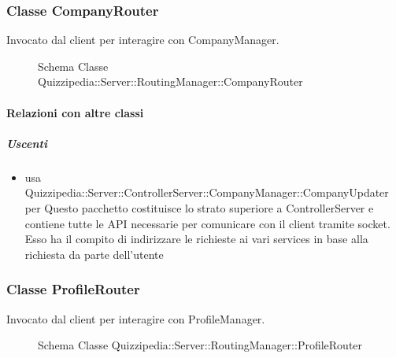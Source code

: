 \subsubsection{Classe CompanyRouter}
Invocato dal client per interagire con CompanyManager.
\begin{figure}[H]
\centering
\noindent{}
\caption[Schema Classe CompanyRouter]{Schema Classe Quizzipedia::Server::RoutingManager::CompanyRouter}
\end{figure}
\paragraph{Relazioni con altre classi}
\subparagraph{Uscenti}
\begin{itemize}
\item usa Quizzipedia::Server::ControllerServer::CompanyManager::CompanyUpdater per Questo pacchetto costituisce lo strato superiore a ControllerServer e contiene tutte le API necessarie per comunicare con il client tramite socket. Esso ha il compito di indirizzare le richieste ai vari services in base alla richiesta da parte dell'utente
\end{itemize}
\subsubsection{Classe ProfileRouter}
Invocato dal client per interagire con ProfileManager.
\begin{figure}[H]
\centering
\noindent{}
\caption[Schema Classe ProfileRouter]{Schema Classe Quizzipedia::Server::RoutingManager::ProfileRouter}
\end{figure}
